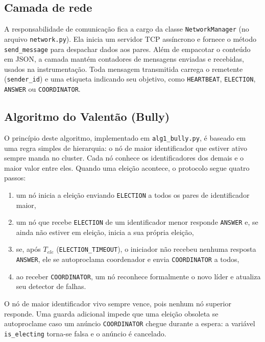 \documentclass[journal]{IEEEtran}
\begin{document}
\subsection{Camada de rede}
A responsabilidade de comunicação fica a cargo da classe \texttt{NetworkManager} (no arquivo \texttt{network.py}). Ela inicia um servidor TCP assíncrono e fornece o método \texttt{send\_message} para despachar dados aos pares. Além de empacotar o conteúdo em JSON, a camada mantém contadores de mensagens enviadas e recebidas, usados na instrumentação. Toda mensagem transmitida carrega o remetente (\texttt{sender\_id}) e uma etiqueta indicando seu objetivo, como \texttt{HEARTBEAT}, \texttt{ELECTION}, \texttt{ANSWER} ou \texttt{COORDINATOR}.

\subsection{Algoritmo do Valentão (Bully)}
O princípio deste algoritmo, implementado em \texttt{alg1\_bully.py}, é baseado em uma regra simples de hierarquia: o nó de maior identificador que estiver ativo sempre manda no cluster. Cada nó conhece os identificadores dos demais e o maior valor entre eles. Quando uma eleição acontece, o protocolo segue quatro passos:
\begin{enumerate}
    \item um nó inicia a eleição enviando \texttt{ELECTION} a todos os pares de identificador maior,
    \item um nó que recebe \texttt{ELECTION} de um identificador menor responde \texttt{ANSWER} e, se ainda não estiver em eleição, inicia a sua própria eleição,
    \item se, após $T_{ele}$ (\texttt{ELECTION\_TIMEOUT}), o iniciador não recebeu nenhuma resposta \texttt{ANSWER}, ele se autoproclama coordenador e envia \texttt{COORDINATOR} a todos,
    \item ao receber \texttt{COORDINATOR}, um nó reconhece formalmente o novo líder e atualiza seu detector de falhas.
\end{enumerate}
O nó de maior identificador vivo sempre vence, pois nenhum nó superior responde. Uma guarda adicional impede que uma eleição obsoleta se autoproclame caso um anúncio \texttt{COORDINATOR} chegue durante a espera: a variável \texttt{is\_electing} torna-se falsa e o anúncio é cancelado.
\end{document}
